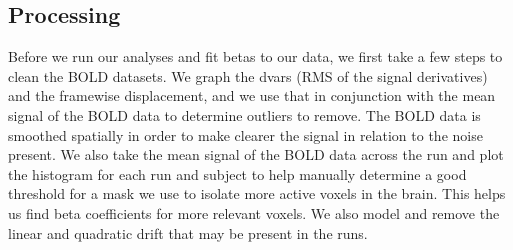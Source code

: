 \subsection{Processing}
Before we run our analyses and fit betas to our data, we first take a few steps to clean the BOLD datasets. We graph the dvars (RMS of the signal derivatives) and the framewise displacement, and we use that in conjunction with the mean signal of the BOLD data to determine outliers to remove. The BOLD data is smoothed spatially in order to make clearer the signal in relation to the noise present. We also take the mean signal of the BOLD data across the run and plot the histogram for each run and subject to help manually determine a good threshold for a mask we use to isolate more active voxels in the brain. This helps us find beta coefficients for more relevant voxels. We also model and remove the linear and quadratic drift that may be present in the runs. 

